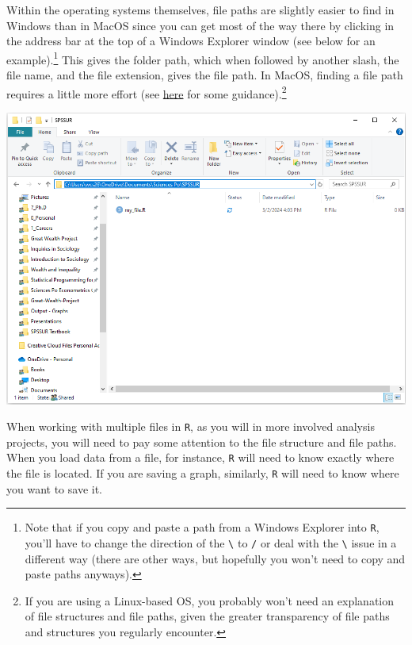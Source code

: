 \documentclass[
  letterpaper,
]{book}
\begin{document}
Within the operating systems themselves, file paths are slightly easier
to find in Windows than in MacOS since you can get most of the way there
by clicking in the address bar at the top of a Windows Explorer window
(see below for an example).\footnote{Note that if you copy and paste a
  path from a Windows Explorer into \texttt{R}, you'll have to change
  the direction of the \texttt{\textbackslash{}} to \texttt{/} or deal
  with the \texttt{\textbackslash{}} issue in a different way (there are
  other ways, but hopefully you won't need to copy and paste paths
  anyways).} This gives the folder path, which when followed by another
slash, the file name, and the file extension, gives the file path. In
MacOS, finding a file path requires a little more effort (see
\href{https://support.apple.com/en-mt/guide/mac-help/mchlp1774/mac\#:~:text=On\%20your\%20Mac\%2C\%20click\%20the,bottom\%20of\%20the\%20Finder\%20window.}{here}
for some guidance).\footnote{If you are using a Linux-based OS, you
  probably won't need an explanation of file structures and file paths,
  given the greater transparency of file paths and structures you
  regularly encounter.}

\includegraphics[width=6.22917in,height=\textheight]{images/Windows-file-path.PNG}

When working with multiple files in \texttt{R}, as you will in more
involved analysis projects, you will need to pay some attention to the
file structure and file paths. When you load data from a file, for
instance, \texttt{R} will need to know exactly where the file is
located. If you are saving a graph, similarly, \texttt{R} will need to
know where you want to save it.
\end{document}

